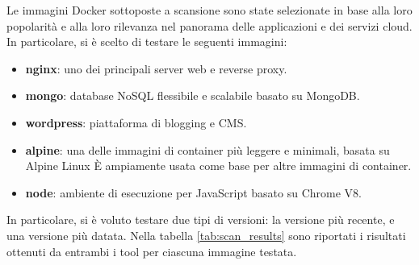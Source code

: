 Le immagini Docker sottoposte a scansione sono state selezionate in base alla loro popolarità e alla loro rilevanza nel panorama delle applicazioni e dei servizi cloud. In particolare, si è scelto di testare le seguenti immagini:
\begin{itemize}
   \item\textbf{nginx}: uno dei principali server web e reverse proxy.
   \item\textbf{mongo}: database NoSQL flessibile e scalabile basato su MongoDB.
   \item\textbf{wordpress}: piattaforma di blogging e CMS.
   \item\textbf{alpine}: una delle immagini di container più leggere e minimali, basata su Alpine Linux È ampiamente usata come base per altre immagini di container.
   \item\textbf{node}: ambiente di esecuzione per JavaScript basato su Chrome V8.
\end{itemize}
In particolare, si è voluto testare due tipi di versioni: la versione più recente, e una versione più datata. Nella tabella \ref{tab:scan_results} sono riportati i risultati ottenuti da entrambi i tool per ciascuna immagine testata.

